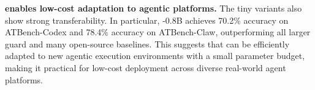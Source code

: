 \textbf{\agentdog{} enables low-cost adaptation to agentic platforms.}
    The tiny \agentdog{} variants also show strong transferability. In
    particular, \agentdog{}-0.8B achieves 70.2\% accuracy on ATBench-Codex and
    78.4\% accuracy on ATBench-Claw, outperforming all larger
    guard and many open-source baselines. This suggests that \agentdog{} can be
    efficiently adapted to new agentic execution environments with a small
    parameter budget, making it practical for low-cost deployment across
    diverse real-world agent platforms.




